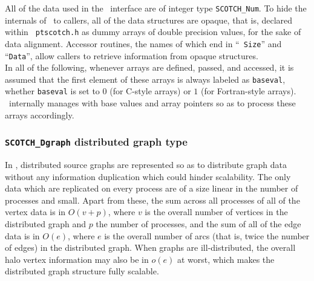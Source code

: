 All of the data used in the \libscotch\ interface are of integer type
{\tt SCOTCH\_Num}. To hide the internals of \ptscotch\ to callers, all
of the data structures are opaque, that is, declared within {\tt
ptscotch.h} as dummy arrays of double precision values, for the sake of
data alignment. Accessor routines, the names of which end in ``{\tt
Size}'' and ``{\tt Data}'', allow callers to retrieve information from
opaque structures.
\\

In all of the following, whenever arrays are defined, passed, and
accessed, it is assumed that the first element of these arrays is
always labeled as {\tt baseval}, whether {\tt baseval} is set to $0$
(for C-style arrays) or $1$ (for Fortran-style arrays). \ptscotch\
internally manages with base values and array pointers so as to
process these arrays accordingly.

\subsubsection{\texttt{SCOTCH\_Dgraph} distributed graph type}
\label{sec-lib-type-dgraph}

In \ptscotch, distributed source graphs are represented so as to
distribute graph data without any information duplication which could
hinder scalability. The only data which are replicated on every
process are of a size linear in the number of processes and
small. Apart from these, the sum across all processes of all of the
vertex data is in $O(v+p)$, where $v$ is the overall number of
vertices in the distributed graph and $p$ the number of processes, and
the sum of all of the edge data is in $O(e)$, where $e$ is the overall
number of arcs (that is, twice the number of edges) in the distributed
graph. When graphs are ill-distributed, the overall halo vertex
information may also be in $o(e)$ at worst, which makes the distributed
graph structure fully scalable.

